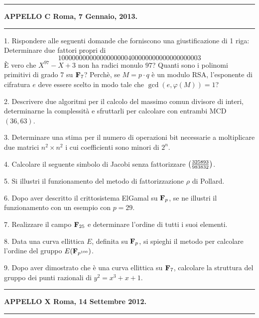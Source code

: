 \smallskip\hrule\smallskip
\centerline{{\bf APPELLO C \hfill Roma, 7 Gennaio, 2013.}}\smallskip\hrule\smallskip
\item{1.} Rispondere alle seguenti domande che forniscono una giustificazione di 1 riga:
 Determinare due fattori propri di $$10000000000000000000400000000000000000003$$
 \`E vero che $X^{97}-X+3$ non ha radici monulo $97$?
 Quanti sono i polinomi primitivi di grado $7$ su ${\bf F}_7$?
 Perch\`e, se $M=p\cdot q$ \`e un modulo RSA, l'esponente
di cifratura $e$ deve essere scelto in modo tale che $\gcd(e,\varphi(M))=1$?
\item{2.} Descrivere due algoritmi per il calcolo del massimo comun divisore di interi, determinarne la complessit\`a e sfruttarli
per calcolare con entrambi MCD$(36,63)$.
\item{3.} Determinare una stima per il numero di operazioni bit necessarie a moltiplicare due matrici $n^2\times n^2$ 
i cui coefficienti sono minori di $2^n$. 
\item{4.} Calcolare il seguente simbolo di Jacobi senza fattorizzare
$\left({325893\over983832}\right)$.
\item{5.} Si illustri il funzionamento del metodo di fattorizzazione $\rho$ di  Pollard.
\item{6.} Dopo aver descritto il crittosistema ElGamal su ${\bf F}_p$, se ne illustri il funzionamento con un esempio con $p = 29$.
\item{7.} Realizzare il campo ${\bf F}_{25}$ e determinare l'ordine di tutti i suoi elementi.
\item{8.} Data una curva ellittica $E$, definita su ${\bf F}_p$, si spieghi il metodo per calcolare l'ordine
del gruppo $E({\bf F}_{p^{100}})$.
\item{9.} Dopo aver dimostrato che \`e una curva ellittica su ${\bf F}_7$, 
calcolare la struttura del gruppo dei punti razionali di $y^2 = x^3 + x + 1$.
\bigskip

\smallskip\hrule\smallskip
\centerline{{\bf APPELLO X \hfill Roma, 14 Settembre 2012.}}\smallskip\hrule\smallskip

